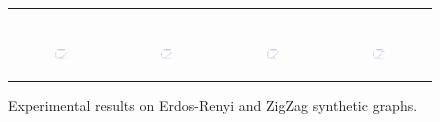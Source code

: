 \begin{figure}[ht]
\begin{tabular}{cccc}
\begin{subfigure}[b]{0.22\textwidth}
	  \end{subfigure} \\
	  \begin{subfigure}[b]{0.22\textwidth}
	  	\includegraphics[width=110pt]{images/validated_CC2G_bigsynthetic_maxgraphcut.eps}
			\caption{}
			\label{appfig:validated_CC2G_bigsynthetic_maxgraphcut}
	  \end{subfigure} &
	  \begin{subfigure}[b]{0.22\textwidth}
	  	\includegraphics[width=110pt]{images/validated_CC2G_bigsynthetic_setcover.eps}
			\caption{}
			\label{appfig:validated_CC2G_bigsynthetic_setcover}
	  \end{subfigure} &
	  \begin{subfigure}[b]{0.22\textwidth}
	  	\includegraphics[width=110pt]{images/validated_CC2G_zigzag_maxgraphcut.eps}
			\caption{}
			\label{appfig:validated_CC2G_zigzag_maxgraphcut}
	  \end{subfigure} &
	  \begin{subfigure}[b]{0.22\textwidth}
	  	\includegraphics[width=110pt]{images/validated_CC2G_zigzag_setcover.eps}
			\caption{}
			\label{appfig:validated_CC2G_zigzag_setcover}
	  \end{subfigure} \\
  \end{tabular}
  \caption{Experimental results on Erdos-Renyi and ZigZag synthetic graphs.}
\end{figure}


